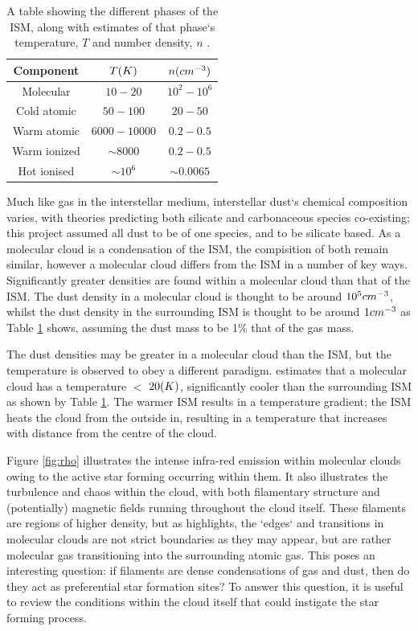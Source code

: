 \documentclass{report}
\begin{document}
\begin{table}[h]
  \centering
   \begin{tabular}{||c c c||}
   \hline
   Component & $T\/(K)$ & $n\/(cm^{-3})$ \\ [0.5ex]
   \hline\hline
   Molecular    & $10-20$      & $10^{2}-10^{6}$ \\
   \hline
   Cold atomic  & $50-100$     & $20-50$ \\
   \hline
   Warm atomic  & $6000-10000$ & $0.2-0.5$ \\
   \hline
   Warm ionized & $\sim8000$    & $0.2-0.5$ \\
   \hline
   Hot ionised  & $\sim10^{6}$  & $\sim0.0065$ \\ [1ex]
   \hline
   \end{tabular}
   \caption{A table showing the different phases of the ISM, along with estimates of that phase`s temperature, $T$ and number density, $n$ \parencite{ism}.}
   \label{table:ism}
\end{table}

Much like gas in the interstellar medium, interstellar dust`s chemical composition varies, with theories predicting both silicate and carbonaceous species co-existing; this project assumed all dust to be of one species, and to be silicate based. As a molecular cloud is a condensation of the ISM, the compisition of both remain similar, however a molecular cloud differs from the ISM in a number of key ways. Significantly greater densities are found within a molecular cloud than that of the ISM. The dust density in a molecular cloud is thought to be around $10^{5}\/cm^{-3}$, whilst the dust density in the surrounding ISM is thought to be around $1\/cm^{-3}$ as Table \ref{table:ism} shows, assuming the dust mass to be 1\% that of the gas mass.

The dust densities may be greater in a molecular cloud than the ISM, but the temperature is observed to obey a different paradigm. \textcite{dustopacity} estimates that a molecular cloud has a temperature $<$ $20\/(K)$, significantly cooler than the surrounding ISM as shown by Table \ref{table:ism}. The warmer ISM results in a temperature gradient; the ISM heats the cloud from the outside in, resulting in a temperature that increases with distance from the centre of the cloud.

Figure \ref{fig:rho} illustrates the intense infra-red emission within molecular clouds owing to the active star forming occurring within them. It also illustrates the turbulence and chaos within the cloud, with both filamentary structure and (potentially) magnetic fields running throughout the cloud itself. These filaments are regions of higher density, but as \textcite{evo-mol} highlights, the `edges` and transitions in molecular clouds are not strict boundaries as they may appear, but are rather molecular gas transitioning into the surrounding atomic gas. This poses an interesting question: if filaments are dense condensations of gas and dust, then do they act as preferential star formation sites? To answer this question, it is useful to review the conditions within the cloud itself that could instigate the star forming process.
\end{document}
